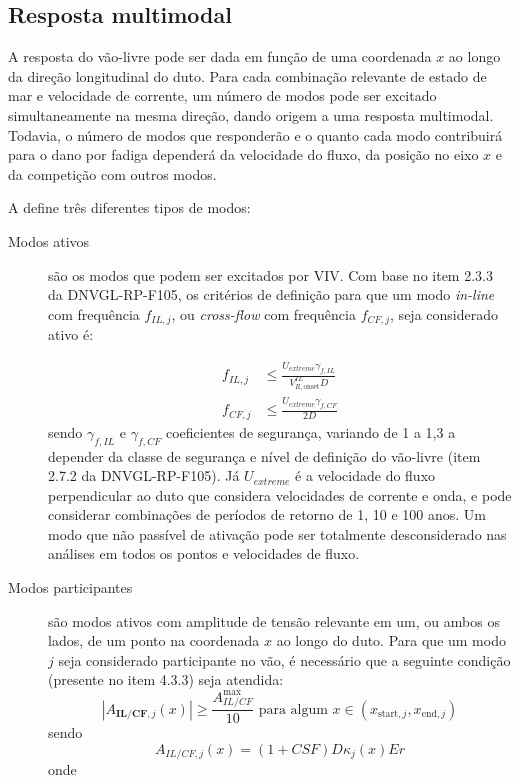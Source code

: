 \subsection{Resposta multimodal}\label{sec:multimode}


A resposta do vão-livre pode ser dada em função de uma coordenada $x$ ao longo da direção longitudinal do duto.
Para cada combinação relevante de estado de mar e velocidade de corrente, um número de modos pode ser excitado simultaneamente na mesma direção, dando origem a uma resposta multimodal.
Todavia, o número de modos que responderão e o quanto cada modo contribuirá para o dano por fadiga dependerá da velocidade do fluxo, da posição no eixo $x$ e da competição com outros modos.

A  define três diferentes tipos de modos:
\begin{description}
	\item[Modos ativos] são os modos que podem ser excitados por VIV\@. Com base no item 2.3.3 da DNVGL-RP-F105, os critérios de definição para que um modo \textit{in-line} com frequência $f_{IL,j}$, ou \textit{cross-flow} com frequência $f_{CF,j}$, seja considerado ativo é:

    \begin{equation}
        \begin{aligned}
        f_{I L, j} & \leq \frac{U_{extreme} \gamma_{f,IL}}{V_{R,\text{onset}}^{IL} D} \\
        f_{C F, j} & \leq \frac{U_{extreme} \gamma_{f,CF}}{2D}
        \end{aligned}
    \end{equation}
    sendo $\gamma_{f,IL}$ e $\gamma_{f,CF}$ coeficientes de segurança, variando de 1 a 1,3 a depender da classe de segurança e nível de
    definição do vão-livre (item 2.7.2 da DNVGL-RP-F105). Já $U_{extreme}$ é a velocidade do fluxo perpendicular ao duto que considera velocidades de corrente e onda, e pode considerar combinações de períodos de retorno de 1, 10 e 100 anos.
    Um modo que não passível de ativação pode ser totalmente desconsiderado nas análises em todos os pontos e velocidades de fluxo.

    \item[Modos participantes] são modos ativos com amplitude de tensão relevante em um, ou ambos os lados, de um ponto na coordenada $x$ ao longo do duto. Para que um modo $j$ seja considerado participante no vão, é necessário que a seguinte condição (presente no item 4.3.3) seja atendida:
    \[
    \left|A_{\textbf{IL/CF}, j}(x)\right| \geq \frac{A_{IL/CF}^{\max}}{10} \text{ para algum } x \in (x_{\text{start},j}, x_{\text{end}, j})
    \]
    sendo
    \[
    A_{IL/CF, j}(x) = (1+CSF) D \kappa_{j}(x) E r
    \]
    onde


\end{description}
